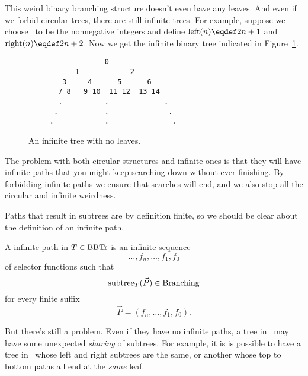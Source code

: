 This weird binary branching structure doesn't even have any leaves.
\fi
And even if we forbid circular trees, there are still infinite
trees.  For example, suppose we choose \brnch\ to be the nonnegative
integers and define $\leftsub{(n)} \eqdef 2n+1$ and $\rightsub{(n)} \eqdef
2n+2$.  Now we get the infinite binary tree indicated in
Figure~\ref{inftree123}.


\begin{figure}


\begin{verbatim}
                  0
           1            2
        3     4      5      6
       7 8   9 10  11 12  13 14
       .          .             . 
      .           .              .
     .            .               . 

\end{verbatim}

\caption{An infinite tree with no leaves.}

\label{inftree123}

\end{figure}

The problem with both circular structures and infinite ones is that
they will have infinite paths that you might keep searching down
without ever finishing.  By forbidding infinite paths we ensure that
searches will end, and we also stop all the circular and infinite
weirdness.

Paths that result in subtrees are by definition finite, so we should
be clear about the definition of an infinite path.

\begin{definition}
A infinite path in $T \in \text{BBTr}$ is an infinite sequence
\[
\dots,f_n,\dots,f_1,f_0
\]
of selector functions such that
\[
\text{subtree}_{T}(\vec{P}) \in \text{Branching}
\]
for every finite suffix
\[
\vec{P} = (f_n,\dots, f_1,f_0).
\]
\end{definition}

But there's still a problem.  Even if they
have no infinite paths, a tree in \brnch\ may have some unexpected
\emph{sharing} of subtrees.  For example, it is is possible to have a
tree in \brnch\ whose left and right subtrees are the same, or
another whose top to bottom paths all end at the \emph{same} leaf.

